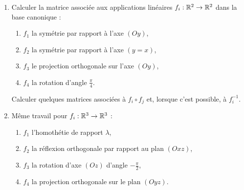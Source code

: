 \begin{frame}

\begin{miniexercice}
\begin{enumerate}
  \item Calculer la matrice associée aux applications linéaires 
  $f_i : \mathbb{R}^2 \to \mathbb{R}^2$ dans la base canonique :
  \begin{enumerate}
  \item $f_1$ la symétrie par rapport à l'axe $(Oy)$,
  \item $f_2$ la symétrie par rapport à l'axe $(y=x)$,
  \item $f_3$ le projection orthogonale sur l'axe $(Oy)$,
  \item $f_4$ la rotation d'angle $\frac\pi4$.
  \end{enumerate}
  Calculer quelques matrices associées à $f_i \circ f_j$ et, 
  lorsque c'est possible, à $f_i^{-1}$.
  
  \item Même travail pour $f_i : \mathbb{R}^3 \to \mathbb{R}^3$ :
  \begin{enumerate}
  \item $f_1$ l'homothétie de rapport $\lambda$,
  \item $f_2$ la réflexion orthogonale par rapport au plan $(Oxz)$,
  \item $f_3$ la rotation d'axe $(Oz)$ d'angle $-\frac{\pi}{2}$,
  \item $f_4$ la projection orthogonale sur le plan $(Oyz)$.
  \end{enumerate}  
\end{enumerate}
\end{miniexercice}

\end{frame}

